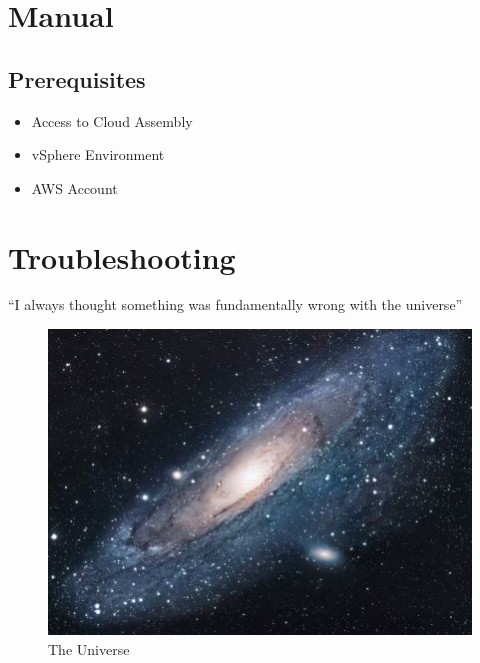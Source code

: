 \documentclass{article}
\begin{document}
\newpage

\section{Manual}
\subsection{Prerequisites}
\begin{itemize}
  \item Access to Cloud Assembly
  \item vSphere Environment 
  \item AWS Account
\end{itemize}


\section{Troubleshooting}
``I always thought something was fundamentally wrong with the universe'' \citep{adams1995hitchhiker}


\begin{figure}[h!]
\centering
\includegraphics[scale=1.7]{universe}
\caption{The Universe}
\label{fig:universe}
\end{figure}




\end{document}
